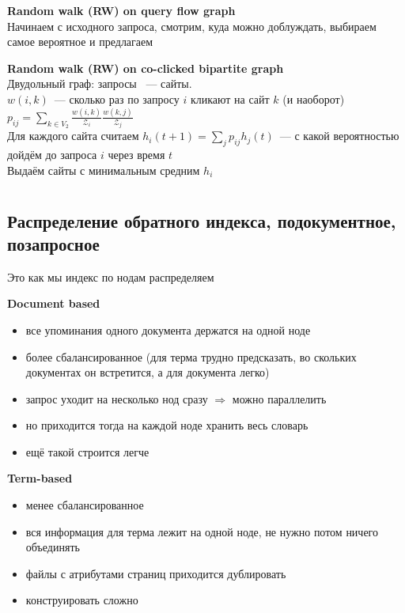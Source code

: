 \documentclass[12pt]{article}
\def\SO{\Rightarrow}          %
\begin{document}
    \smallskip\smallskip
    {\bf Random walk (RW) on query flow graph}\\
      Начинаем с исходного запроса, смотрим, куда можно доблуждать, выбираем самое вероятное и предлагаем

    \smallskip\smallskip
    {\bf Random walk (RW) on co-clicked bipartite graph}\\
      Двудольный граф: запросы ~--- сайты.\\
      $w(i, k)$~--- сколько раз по запросу $i$ кликают на сайт $k$ (и наоборот)\\
      $p_{ij} = \sum\limits_{k \in V_2} \frac{w(i, k)}{\mathcal{Z}_i} \frac{w(k, j)}{\mathcal{Z}_j}$\\
      Для каждого сайта считаем $h_i(t + 1) = \sum\limits_j p_{ij} h_j(t)$~--- с какой вероятностью дойдём до запроса $i$ через время $t$\\
      Выдаём сайты с минимальным средним $h_i$

\pagebreak %

\section{} %

  \subsection{Распределение обратного индекса, подокументное, позапросное}
    Это как мы индекс по нодам распределяем

    \smallskip\smallskip
    {\bf Document based}
      \begin{itemize}
          \item все упоминания одного документа держатся на одной ноде
          \item более сбалансированное (для терма трудно предсказать, во скольких документах он встретится, а для документа легко)
          \item запрос уходит на несколько нод сразу $\SO$ можно параллелить
          \item но приходится тогда на каждой ноде хранить весь словарь
          \item ещё такой строится легче
      \end{itemize}

    \smallskip\smallskip
    {\bf Term-based}
      \begin{itemize}
          \item менее сбалансированное
          \item вся информация для терма лежит на одной ноде, не нужно потом ничего объединять
          \item файлы с атрибутами страниц приходится дублировать
          \item конструировать сложно
      \end{itemize}
    \pagebreak
\end{document}
